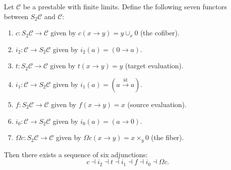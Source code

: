 \documentclass[a4paper,10pt, oneside]{amsart}
\begin{document}
\begin{prop}\label{adjss2}
	Let $\mathcal{C}$ be a prestable \infcat with finite limits. Define the following seven functors between $S_2\mathcal{C}$ and $\mathcal{C}$:
	\begin{enumerate}[label=(\arabic*),font=\normalfont]
		\item $c: S_2\mathcal{C} \to \mathcal{C}$ given by $c(x \to y) = y \cup_x 0$ (the cofiber).
		\item $i_2: \mathcal{C} \to S_2\mathcal{C}$ given by $i_2(a) = (0 \to a)$.
		\item $t: S_2\mathcal{C} \to \mathcal{C}$ given by $t(x \to y) = y$ (target evaluation).
		\item $i_1: \mathcal{C} \to S_2\mathcal{C}$ given by $i_1(a) = (a \xrightarrow{\operatorname{id}} a)$.
		\item $f: S_2\mathcal{C} \to \mathcal{C}$ given by $f(x \to y) = x$ (source evaluation).
		\item $i_0: \mathcal{C} \to S_2\mathcal{C}$ given by $i_0(a) = (a \to 0)$.
		\item $\Omega c: S_2\mathcal{C} \to \mathcal{C}$ given by $\Omega c(x \to y) = x \times_y 0$ (the fiber).
	\end{enumerate}
	Then there exists a sequence of six adjunctions:
	$$ c \dashv i_2 \dashv t \dashv i_1 \dashv f \dashv i_0 \dashv \Omega c .$$
\end{prop}
\end{document}
